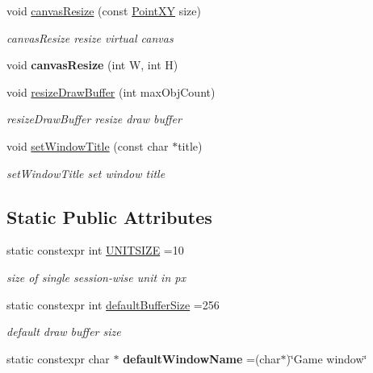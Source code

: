 \begin{DoxyCompactItemize}
\item 
void \hyperlink{classRenderEngine_a6b3570ba21bac9e92bd2caebc8362b16}{canvas\+Resize} (const \hyperlink{classPointXY}{Point\+X\+Y} size)
\begin{DoxyCompactList}\small\item\em canvas\+Resize resize virtual canvas \end{DoxyCompactList}\item 
\hypertarget{classRenderEngine_a9ed2b4db51b92a361ec13c1c5be51ce5}{}void {\bfseries canvas\+Resize} (int W, int H)\label{classRenderEngine_a9ed2b4db51b92a361ec13c1c5be51ce5}

\item 
void \hyperlink{classRenderEngine_a92afa48be7f48d9e5697fbb878348267}{resize\+Draw\+Buffer} (int max\+Obj\+Count)
\begin{DoxyCompactList}\small\item\em resize\+Draw\+Buffer resize draw buffer \end{DoxyCompactList}\item 
void \hyperlink{classRenderEngine_a78ce63c93988c74ec7b5d5535570c001}{set\+Window\+Title} (const char $\ast$title)
\begin{DoxyCompactList}\small\item\em set\+Window\+Title set window title \end{DoxyCompactList}\end{DoxyCompactItemize}
\subsection*{Static Public Attributes}
\begin{DoxyCompactItemize}
\item 
\hypertarget{classRenderEngine_a6e727b66ab4af5ec0a3db0020217137c}{}static constexpr int \hyperlink{classRenderEngine_a6e727b66ab4af5ec0a3db0020217137c}{U\+N\+I\+T\+S\+I\+Z\+E} =10\label{classRenderEngine_a6e727b66ab4af5ec0a3db0020217137c}

\begin{DoxyCompactList}\small\item\em size of single session-\/wise unit in px \end{DoxyCompactList}\item 
\hypertarget{classRenderEngine_a9dc4537015d6db0e13cf78364caacddf}{}static constexpr int \hyperlink{classRenderEngine_a9dc4537015d6db0e13cf78364caacddf}{default\+Buffer\+Size} =256\label{classRenderEngine_a9dc4537015d6db0e13cf78364caacddf}

\begin{DoxyCompactList}\small\item\em default draw buffer size \end{DoxyCompactList}\item 
\hypertarget{classRenderEngine_a2039eceae60c84d8640e01cf76dd7e06}{}static constexpr char $\ast$ {\bfseries default\+Window\+Name} =(char$\ast$)\char`\"{}Game window\char`\"{}\label{classRenderEngine_a2039eceae60c84d8640e01cf76dd7e06}

\end{DoxyCompactItemize}


